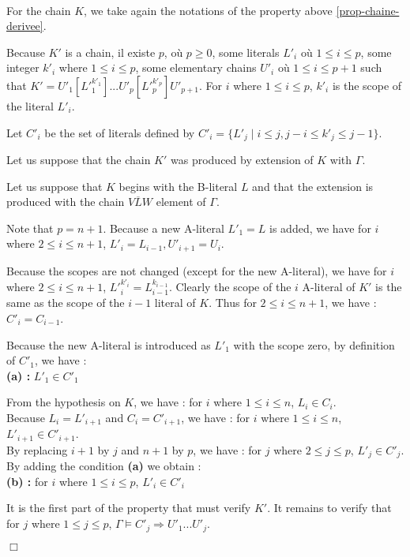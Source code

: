 \documentclass{article}
\newenvironment{preuve}{\noindent {\em Proof :}\ }{{\hfill
    $\Box$}\vspace{.5pc}} \newcommand{\sg}{\!\!<\!\!}
\begin{document}
\begin{preuve}

For the chain $K$, we take again the notations of the property above \ref{prop-chaine-derivee}.

Because $K'$ is a chain,  
il existe $p$, où $p \geq 0$,  some literals $L'_i$ où $1 \leq i \leq p$, some integer $k'_i$ where $1 \leq i \leq p$, 
some elementary chains 
 $U'_i$ où $1 \leq i \leq p+1$ such that $K' = U'_1[{L'}_1^{{k'}_1}]...U'_p[{L'}_p^{{k'}_p}]U'_{p+1}$.
For $i$ where $1 \leq i \leq p$, $k'_i$ is the scope of the literal $L'_i$.

Let $C'_i$ be the set of literals defined by 
$C'_i = \{ {L'}_j \mid i \leq j, j-i \leq {k'}_j \leq j-1\}$.

\begin{itemrond}
\item Let us suppose that the chain $K'$ was produced by extension of $K$ with $\Gamma$. 

Let us suppose that $K$ begins with the B-literal $L$ and that the extension is produced with the chain $V\overline{L}W$
element of $\Gamma$. 

Note that $p = n+1$.
Because a new A-literal  $L'_1 = L$ is added, we have for $i$ where $2 \leq i \leq n+1$, $L'_i = L_{i-1}, U'_{i+1}=U_i$.

Because the scopes are not changed (except for the new A-literal), we have for $i$ where  $2 \leq i \leq n+1$,
${L'}_i^{k'_i} = L_{i-1}^{k_{i-1}}$. 
Clearly the scope of the $i$ A-literal of $K'$ is the same as the scope of the $i-1$ literal
of $K$. Thus for  $2 \leq i \leq n+1$, we have : $C'_i = C_{i-1}$. 

Because the new A-literal is introduced as  $L'_1$ with the scope zero, by definition of 
 $C'_1$, we have :\\
\textbf{(a) : } $L'_1 \in C'_1$

From the hypothesis on $K$, we have : for  $i$ where $1 \leq i \leq n$, $L_i \in C_i$. \\ 
Because $L_i = L'_{i+1}$ and $C_i = C'_{i+1}$, we have : for  $i$ where $1 \leq i \leq n$, $L'_{i+1} \in C'_{i+1}$.\\
By replacing $i+1$ by $j$ and $n+1$ by $p$, we have : for $j$ where  $2 \leq j \leq p$, $L'_j  \in C'_j$. 
By adding the condition \textbf{(a)} we obtain :\\
\textbf{(b) : } for $i$ where $1 \leq i \leq p$, $L'_i \in C'_i$

It is the first part of the property that must verify $K'$. It remains to verify that 
for $j$ where $1 \leq j \leq p$, $\Gamma \models C'_j \Rightarrow U'_1...U'_j$.


\end{itemrond}
\end{preuve}
\end{document}
